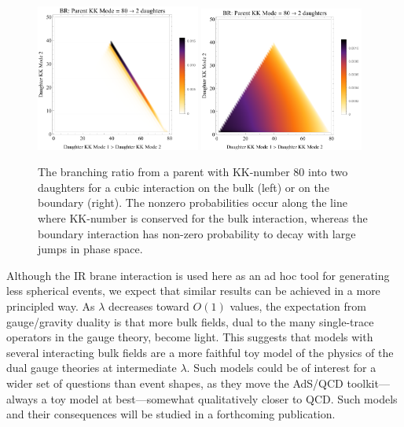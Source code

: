 \begin{figure}[tb!]
	\centering
	\includegraphics[width=0.48\textwidth]{figures/DS_KKBR_bulk.pdf}
	\includegraphics[width=0.48\textwidth]{figures/DS_KKBR_boundary.pdf}
	\caption{The branching ratio from a parent with KK-number 80 into two daughters for a cubic interaction on the bulk (left) or on the boundary (right). The nonzero probabilities occur along the line where KK-number is conserved for the bulk interaction, whereas the boundary interaction has non-zero probability to decay with large jumps in phase space. }
	\label{fig:BR}
\end{figure}

Although the IR brane interaction is used here as an ad hoc tool for generating less spherical events, we expect that similar results can be achieved in a more principled way. As $\lambda$ decreases toward $O(1)$ values, the expectation from gauge/gravity duality is that more bulk fields, dual to the many single-trace operators in the gauge theory, become light. This suggests that models with several interacting bulk fields are a more faithful toy model of the physics of the dual gauge theories at intermediate $\lambda$. Such models could be of interest for a wider set of questions than event shapes, as they move the AdS/QCD toolkit---always a toy model at best---somewhat qualitatively closer to QCD. Such models and their consequences will be studied in a forthcoming publication.

